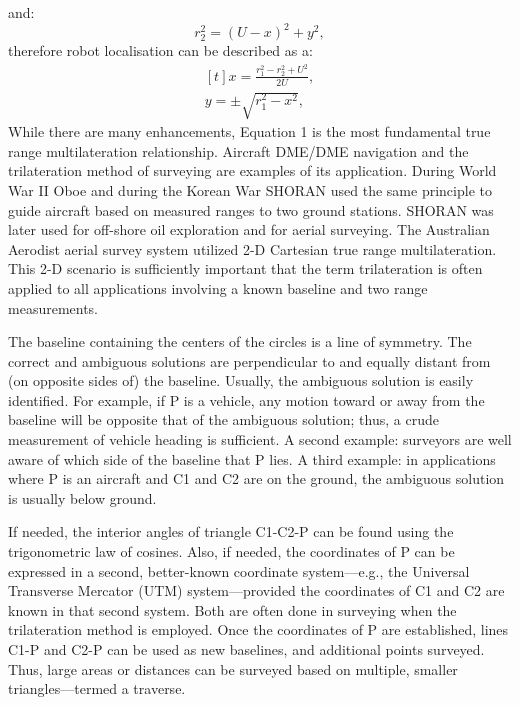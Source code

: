 and:
\begin{equation}
	\label{equ:ptyhagoras1}
	r_{2}^{2} = (U-x)^{2} + y^{2},
\end{equation}
therefore robot localisation can be described as a:
\begin{equation}
	\label{equ:two_point_loc}
	\begin{aligned}[t]
		x = \frac{r_{1}^{2}-r_{2}^{2}+U^{2}}{2U},\\
		y = \pm \sqrt{r_{1}^{2}-x^{2}},
	\end{aligned}
\end{equation}
While there are many enhancements, Equation 1 is the most fundamental true range multilateration
relationship.
Aircraft DME/DME navigation and the trilateration method of surveying are examples of
its application. During World War II Oboe and during the Korean War SHORAN used the same 
principle to guide aircraft based on measured ranges to two ground stations.
SHORAN was later used for off-shore oil exploration and for aerial surveying.
The Australian Aerodist aerial survey system utilized 2-D Cartesian true range multilateration.
This 2-D scenario is sufficiently important that the term trilateration is often applied to all
applications involving a known baseline and two range measurements.

The baseline containing the centers of the circles is a line of symmetry.
The correct and ambiguous solutions are perpendicular to and equally distant from
(on opposite sides of) the baseline. Usually, the ambiguous solution is easily identified.
For example, if P is a vehicle, any motion toward or away from the baseline will be opposite 
that of the ambiguous solution; thus, a crude measurement of vehicle heading is sufficient. 
A second example: surveyors are well aware of which side of the baseline that P lies. 
A third example: in applications where P is an aircraft and C1 and C2 are on the ground,
the ambiguous solution is usually below ground.

If needed, the interior angles of triangle C1-C2-P can be found using the trigonometric 
law of cosines. Also, if needed, the coordinates of P can be expressed in a second,
better-known coordinate system—e.g., the Universal Transverse Mercator (UTM) system—provided 
the coordinates of C1 and C2 are known in that second system. Both are often done in surveying
when the trilateration method is employed.
Once the coordinates of P are established, lines C1-P and C2-P can be used as new baselines, and
additional points surveyed.
Thus, large areas or distances can be surveyed based on multiple,
smaller triangles—termed a traverse.

